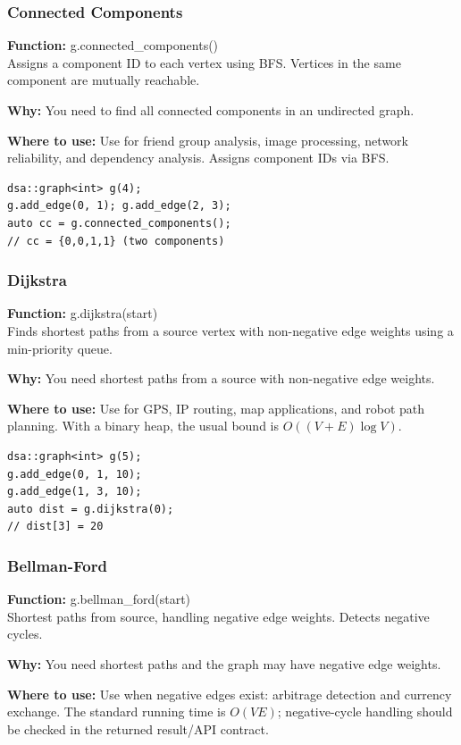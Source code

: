 \documentclass[11pt]{article}
\begin{document}
\subsubsection{Connected Components}
\textbf{Function:} g.connected\_components()\\

Assigns a component ID to each vertex using BFS. Vertices in the same component are mutually reachable.

\textbf{Why:} You need to find all connected components in an undirected graph. \par \textbf{Where to use:} Use for friend group analysis, image processing, network reliability, and dependency analysis. Assigns component IDs via BFS.

\begin{lstlisting}
dsa::graph<int> g(4);
g.add_edge(0, 1); g.add_edge(2, 3);
auto cc = g.connected_components();
// cc = {0,0,1,1} (two components)
\end{lstlisting}

\subsubsection{Dijkstra}
\textbf{Function:} g.dijkstra(start)\\

Finds shortest paths from a source vertex with non-negative edge weights using a min-priority queue.

\textbf{Why:} You need shortest paths from a source with non-negative edge weights. \par \textbf{Where to use:} Use for GPS, IP routing, map applications, and robot path planning. With a binary heap, the usual bound is \(O((V+E)\log V)\).

\begin{lstlisting}
dsa::graph<int> g(5);
g.add_edge(0, 1, 10);
g.add_edge(1, 3, 10);
auto dist = g.dijkstra(0);
// dist[3] = 20
\end{lstlisting}

\subsubsection{Bellman-Ford}
\textbf{Function:} g.bellman\_ford(start)\\

Shortest paths from source, handling negative edge weights. Detects negative cycles.

\textbf{Why:} You need shortest paths and the graph may have negative edge weights. \par \textbf{Where to use:} Use when negative edges exist: arbitrage detection and currency exchange. The standard running time is \(O(VE)\); negative-cycle handling should be checked in the returned result/API contract.
\end{document}
